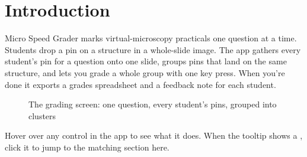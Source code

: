 \section{Introduction}\label{sec:index}

\label{sec:index:micro-speed-grader-help}

Micro Speed Grader marks virtual-microscopy practicals one question at a time. Students drop a pin on a structure in a whole-slide image. The app gathers every student's pin for a question onto one slide, groups pins that land on the same structure, and lets you grade a whole group with one key press. When you're done it exports a grades spreadsheet and a feedback note for each student.

\begin{figure}[H]\centering{}\caption{The grading screen: one question, every student's pins, grouped into clusters}\label{fig:overview}\end{figure}
\vspace{-10pt}
\begin{note}Hover over any control in the app to see what it does. When the tooltip shows a , click it to jump to the matching section here.\end{note}
\vspace{-10pt}